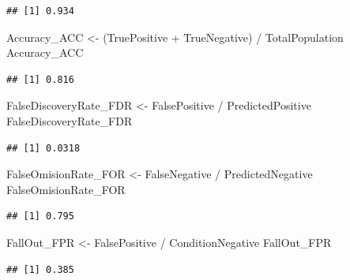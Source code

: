 \documentclass[
]{book}
\newenvironment{Shaded}{\begin{snugshade}}{\end{snugshade}}
\newcommand{\NormalTok}[1]{#1}
\newcommand{\OtherTok}[1]{\textcolor[rgb]{0.56,0.35,0.01}{#1}}
\newcommand{\SpecialCharTok}[1]{\textcolor[rgb]{0.00,0.00,0.00}{#1}}
\begin{document}
\begin{verbatim}
## [1] 0.934
\end{verbatim}

\begin{Shaded}
\begin{Highlighting}[]
\NormalTok{Accuracy\_ACC }\OtherTok{\textless{}{-}}\NormalTok{ (TruePositive }\SpecialCharTok{+}\NormalTok{ TrueNegative) }\SpecialCharTok{/}\NormalTok{ TotalPopulation}
\NormalTok{Accuracy\_ACC}
\end{Highlighting}
\end{Shaded}

\begin{verbatim}
## [1] 0.816
\end{verbatim}

\begin{Shaded}
\begin{Highlighting}[]
\NormalTok{FalseDiscoveryRate\_FDR }\OtherTok{\textless{}{-}}\NormalTok{ FalsePositive }\SpecialCharTok{/}\NormalTok{ PredictedPositive}
\NormalTok{FalseDiscoveryRate\_FDR}
\end{Highlighting}
\end{Shaded}

\begin{verbatim}
## [1] 0.0318
\end{verbatim}

\begin{Shaded}
\begin{Highlighting}[]
\NormalTok{FalseOmisionRate\_FOR }\OtherTok{\textless{}{-}}\NormalTok{ FalseNegative }\SpecialCharTok{/}\NormalTok{ PredictedNegative }
\NormalTok{FalseOmisionRate\_FOR}
\end{Highlighting}
\end{Shaded}

\begin{verbatim}
## [1] 0.795
\end{verbatim}

\begin{Shaded}
\begin{Highlighting}[]
\NormalTok{FallOut\_FPR }\OtherTok{\textless{}{-}}\NormalTok{ FalsePositive }\SpecialCharTok{/}\NormalTok{ ConditionNegative}
\NormalTok{FallOut\_FPR}
\end{Highlighting}
\end{Shaded}

\begin{verbatim}
## [1] 0.385
\end{verbatim}
\end{document}
